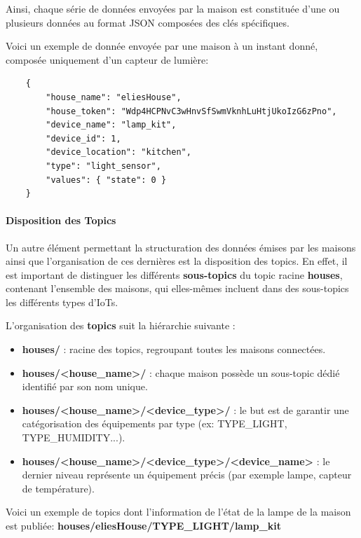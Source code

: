 \documentclass[10pt, a4paper]{report}
\begin{document}
	Ainsi, chaque série de données envoyées par la maison est constituée d'une ou plusieurs données au format JSON composées des clés spécifiques.
	
	Voici un exemple de donnée envoyée par une maison à un instant donné, composée uniquement d'un capteur de lumière:
	
	\begin{lstlisting}
	{
		"house_name": "eliesHouse",
		"house_token": "Wdp4HCPNvC3wHnvSfSwmVknhLuHtjUkoIzG6zPno",
		"device_name": "lamp_kit",
		"device_id": 1,
		"device_location": "kitchen",
		"type": "light_sensor",
		"values": { "state": 0 }
	}
	\end{lstlisting}
	
	\paragraph{Disposition des Topics\\}
	

Un autre élément permettant la structuration des données émises par les maisons ainsi que l'organisation de ces dernières est la disposition des topics.
En effet, il est important de distinguer les différents \textbf{sous-topics} du topic racine \textbf{houses}, contenant l'ensemble des maisons, qui elles-mêmes incluent dans des sous-topics les différents types d'IoTs.

L'organisation des \textbf{topics} suit la hiérarchie suivante :
\begin{itemize}
	\item \textbf{houses/} : racine des topics, regroupant toutes les maisons connectées.
	\item \textbf{houses/<house\_name>/} : chaque maison possède un sous-topic dédié identifié par son nom unique.
	\item \textbf{houses/<house\_name>/<device\_type>/} : le but est de garantir une catégorisation des équipements par type (ex: TYPE\_LIGHT, TYPE\_HUMIDITY...).
	\item \textbf{houses/<house\_name>/<device\_type>/<device\_name>} : le dernier niveau représente un équipement précis (par exemple lampe, capteur de température).
\end{itemize}

	\vspace{1cm}
	
	Voici un exemple de topics dont l'information de l'état de la lampe de la maison est publiée:
	\textbf{houses/eliesHouse/TYPE\_LIGHT/lamp\_kit}\\
	
\end{document}
